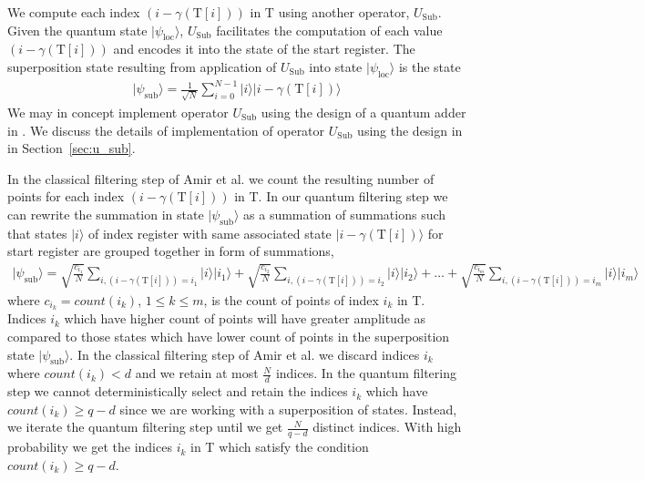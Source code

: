 We compute each index $(i - \gamma(\text{T}[i]))$ in T using another operator, $U_{\mathrm{Sub}}$. Given the quantum state $\vert \psi_{\mathrm{loc}} \rangle$, $U_{\mathrm{Sub}}$ facilitates the computation of each value $(i - \gamma(\text{T}[i]))$ and encodes it into the state of the start register. The superposition state resulting from application of $U_{\mathrm{Sub}}$ into state $\vert \psi_{\mathrm{loc}} \rangle$ is the state
\begin{align}\label{eqn:psi-sub}
	\vert \psi_{\mathrm{sub}} \rangle = \frac{1}{\sqrt{N}} \sum_{i=0}^{N-1} \vert i \rangle \vert i - \gamma(\text{T}[i]) \rangle
\end{align}
We may in concept implement operator $U_{\mathrm{Sub}}$ using the design of a quantum adder in \cite{Barenco1996}. We discuss the details of implementation of operator $U_{\mathrm{Sub}}$ using the design in \cite{Barenco1996} in Section~\ref{sec:u_sub}.

In the classical filtering step of Amir et al. we count the resulting number of points for each index $(i - \gamma(\text{T}[i]))$ in T. In our quantum filtering step we can rewrite the summation in state $\vert \psi_{\mathrm{sub}} \rangle$  as a summation of summations such that states $\vert i \rangle$ of index register with same associated state $\vert i - \gamma(\text{T}[i]) \rangle$ for start register are grouped together in form of summations,
\begin{align}\label{eqn:psi-sub-sum}
	\vert \psi_{\mathrm{sub}} \rangle = \sqrt{\frac{c_{i_1}}{N}} \sum_{i, (i- \gamma(\text{T}[i]))=i_1} \vert i \rangle \vert i_1 \rangle + \sqrt{\frac{c_{i_2}}{N}} \sum_{i, (i- \gamma(\text{T}[i]))=i_2} \vert i \rangle \vert i_2 \rangle + \ldots + \sqrt{\frac{c_{i_m}}{N}} \sum_{i, (i-\gamma(\text{T}[i]))=i_m} \vert i \rangle \vert i_m \rangle
\end{align}
where $c_{i_k} = count\left( i_k \right)$, $1 \leq k \leq m$, is the count of points of index $i_k$ in T. Indices $i_k$ which have higher count of points will have greater amplitude as compared to those states which have lower count of points in the superposition state $\vert \psi_{\mathrm{sub}} \rangle$. In the classical filtering step of Amir et al. we discard indices $i_k$ where $count(i_k) < d$ and we retain at most $\frac{N}{d}$ indices. In the quantum filtering step we cannot deterministically select and retain the indices $i_k$ which have $count(i_k) \geq q-d$ since we are working with a superposition of states. Instead, we iterate the quantum filtering step until we get $\frac{N}{q-d}$ distinct indices. With high probability we get the indices $i_k$ in T which satisfy the condition $count(i_k) \geq q-d$.

